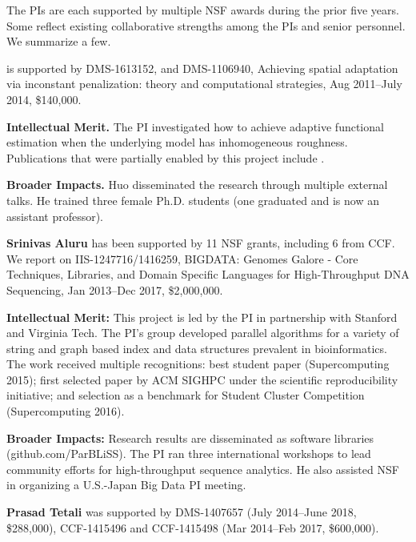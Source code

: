 \documentclass[12pt]{article}
\begin{document}
The PIs are each supported by multiple NSF awards during the prior five years. Some reflect existing collaborative strengths among the PIs and senior personnel.
We summarize a few.
\vspace*{0.25em}

 is supported by DMS-1613152, and DMS-1106940, Achieving spatial adaptation via inconstant penalization: theory and computational strategies, Aug 2011--July 2014, \$140,000.

{\bf Intellectual Merit.}
The PI investigated how to achieve adaptive functional estimation when the underlying model has inhomogeneous roughness.
Publications that were partially enabled by this project include \cite{YangBook2014,Xu-13-pakdd,Kim-12-jns,Bastani-13-TASE,Wang-13-sp,Kim-13-aml,Kim-14-aor,Kim-14-ejs, Kim-14-TASE,Zhang-14,Wang-15-cusum,Huo-15-technometrics,Debraj-12-icdcs,lu-12-TAC,Huo-15-technometrics}.

{\bf Broader Impacts.} Huo disseminated the research through multiple external talks. He trained three female Ph.D. students (one graduated and is now an assistant professor).

\vspace*{0.25em}
\noindent
{\bf Srinivas Aluru} has been supported by 11 NSF grants, including 6 from CCF. We report on IIS-1247716/1416259, BIGDATA: Genomes Galore - Core Techniques, Libraries, and Domain Specific Languages for High-Throughput DNA Sequencing, Jan 2013--Dec 2017, \$2,000,000.

{\bf Intellectual Merit:} This project is led by the PI in partnership with Stanford and Virginia Tech. The PI's group developed parallel algorithms for a variety of string and graph based index and data structures prevalent in bioinformatics. The work received multiple recognitions: best student paper (Supercomputing 2015); first selected paper by ACM SIGHPC under the scientific reproducibility initiative; and selection as a benchmark for Student Cluster Competition (Supercomputing 2016).

{\bf Broader Impacts:} Research results are disseminated as software libraries (github.com/ParBLiSS). The PI ran three international workshops to lead community efforts for high-throughput sequence analytics. He also assisted NSF in organizing a U.S.-Japan Big Data PI meeting.

\vspace*{0.25em}
\noindent
{\bf Prasad Tetali} was supported by DMS-1407657 (July 2014--June 2018, \$288,000), CCF-1415496 and CCF-1415498 (Mar 2014--Feb 2017, \$600,000).
\end{document}
